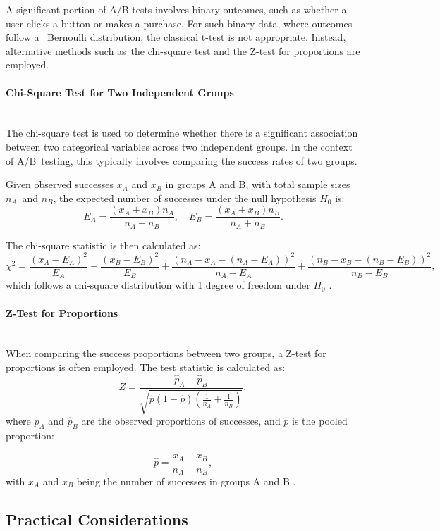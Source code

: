 \documentclass[magisterska, english]{pwr_wmat_praca_dyplomowa}
\theoremstyle{plain}
\numberwithin{theorem}{chapter}
\theoremstyle{definition}
\numberwithin{theorem}{chapter}
\newcommand{\myparagraph}[1]{\paragraph{#1}\mbox{}\\}
\begin{document}
A significant portion of A/B tests involves binary outcomes, such as whether a user clicks a button or makes a purchase. For such binary data, where outcomes follow a~ Bernoulli distribution, the classical t-test is not appropriate. Instead, alternative methods such as~the chi-square test and the Z-test for proportions are employed.

\myparagraph{Chi-Square Test for Two Independent Groups}

The chi-square test is used to determine whether there is a significant association between two categorical variables across two independent groups. In the context of A/B~testing, this typically involves comparing the success rates of two groups.

Given observed successes \( x_A \) and \( x_B \) in groups A and B, with total sample sizes \( n_A \)~and \( n_B \), the expected number of successes under the null hypothesis \( H_0 \) is:
\begin{equation*}
	E_A = \frac{(x_A + x_B)  n_A}{n_A + n_B}, \quad E_B = \frac{(x_A + x_B)  n_B}{n_A + n_B}.
\end{equation*}

The chi-square statistic is then calculated as:
\begin{equation*}
	\chi^2 = \frac{(x_A - E_A)^2}{E_A} + \frac{(x_B - E_B)^2}{E_B} + \frac{(n_A - x_A - (n_A - E_A))^2}{n_A - E_A} + \frac{(n_B - x_B - (n_B - E_B))^2}{n_B - E_B},
\end{equation*}
which follows a chi-square distribution with 1 degree of freedom under \( H_0 \) \cite{agresti2012}.

\myparagraph{Z-Test for Proportions}

When comparing the success proportions between two groups, a Z-test for proportions is often employed. The test statistic is calculated as:
\begin{equation}\label{eqn:Z_statistic}
	Z = \frac{\hat{p}_A - \hat{p}_B}{\sqrt{\hat{p}(1-\hat{p})\left(\frac{1}{n_A} + \frac{1}{n_B}\right)}},
\end{equation}
where \( \hat{p}_A \) and \( \hat{p}_B \) are the observed proportions of successes, and \( \hat{p} \) is the pooled proportion:

\[
\hat{p} = \frac{x_A + x_B}{n_A + n_B},
\]
with \( x_A \) and \( x_B \) being the number of successes in groups A and B \cite{Newcombe1998}.
\subsection{Practical Considerations}
\end{document}
